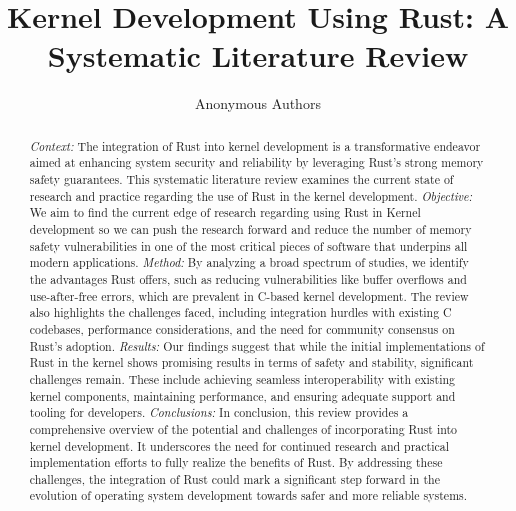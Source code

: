 \documentclass[sigconf]{acmart}
\begin{document}
\title{Kernel Development Using Rust: A Systematic Literature Review}

\author{Anonymous Authors}




\begin{abstract}

  \textit{Context:} The integration of Rust into kernel development is a transformative endeavor aimed
  at enhancing system security and reliability by leveraging Rust's strong memory safety
  guarantees. This systematic literature review examines the current state of research and practice
  regarding the use of Rust in the kernel development.
  \textit{Objective:} We aim to find the current edge of research regarding using Rust in Kernel
  development so we can push the research forward and reduce the number of memory safety
  vulnerabilities in one of the most critical pieces of software that underpins all modern
  applications.
  \textit{Method:} By analyzing a broad spectrum of studies, we identify the advantages Rust offers,
  such as reducing vulnerabilities like buffer overflows and use-after-free errors, which are
  prevalent in C-based kernel development. The review also highlights the challenges faced,
  including integration hurdles with existing C codebases, performance considerations, and the need
  for community consensus on Rust's adoption.
  \textit{Results:} Our findings suggest that while the initial implementations of Rust in the kernel
  shows promising results in terms of safety and stability, significant challenges remain. These
  include achieving seamless interoperability with existing kernel components, maintaining
  performance, and ensuring adequate support and tooling for developers.
  \textit{Conclusions:} In conclusion, this review provides a comprehensive overview of the
  potential and challenges of incorporating Rust into kernel development. It underscores the need for
  continued research and practical implementation efforts to fully realize the benefits of Rust. By
  addressing these challenges, the integration of Rust could mark a significant step forward in the
  evolution of operating system development towards safer and more reliable systems.

\end{abstract}
\end{document}
